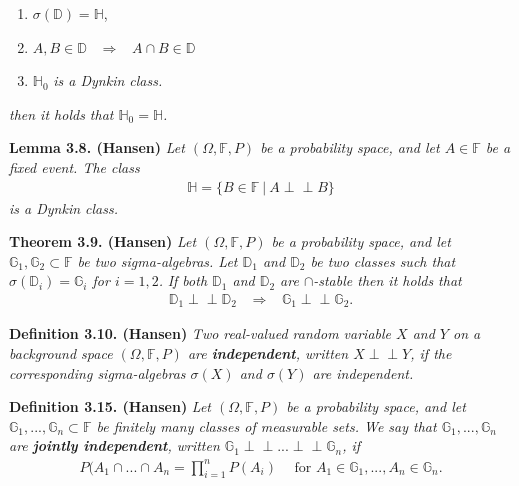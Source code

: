 \documentclass[a4paper,12pt,openany]{book}
\providecommand{\tightlist}{%
 \setlength{\itemsep}{0pt}\setlength{\parskip}{0pt}}
\begin{document}
\begin{enumerate}
\def\labelenumi{\arabic{enumi}.}
\tightlist
\item
  \(\sigma(\mathbb{D})=\mathbb{H}\),
\item
  \(A,B\in\mathbb{D}\hspace{10pt}\Rightarrow\hspace{10pt}A\cap B\in\mathbb{D}\)
\item
  \(\mathbb{H}_0\) \emph{is a Dynkin class.}
\end{enumerate}

\emph{then it holds that \(\mathbb{H}_0=\mathbb{H}\).}

\textbf{Lemma 3.8. (Hansen)} \emph{Let \((\Omega,\mathbb{F},P)\) be a probability space, and let \(A\in\mathbb{F}\) be a fixed event. The class}
\begin{align*}
    \mathbb{H}=\{B\in \mathbb{F}\ \vert\ A\perp \!\!\! \perp B\}
\end{align*}
\emph{is a Dynkin class.}

\textbf{Theorem 3.9. (Hansen)} \emph{Let \((\Omega,\mathbb{F},P)\) be a probability space, and let \(\mathbb{G}_1,\mathbb{G}_2\subset \mathbb{F}\) be two sigma-algebras. Let \(\mathbb{D}_1\) and \(\mathbb{D}_2\) be two classes such that \(\sigma(\mathbb{D}_i)=\mathbb{G}_i\) for \(i=1,2\).}
\emph{If both \(\mathbb{D}_1\) and \(\mathbb{D}_2\) are \(\cap\)-stable then it holds that}
\begin{align*}
    \mathbb{D}_1\perp \!\!\! \perp\mathbb{D}_2\hspace{10pt}\Rightarrow \hspace{10pt} \mathbb{G}_1\perp \!\!\! \perp\mathbb{G}_2.
\end{align*}

\textbf{Definition 3.10. (Hansen)} \emph{Two real-valued random variable \(X\) and \(Y\) on a background space \((\Omega,\mathbb{F},P)\) are \textbf{independent}, written \(X\perp \!\!\! \perp Y\), if the corresponding sigma-algebras \(\sigma(X)\) and \(\sigma(Y)\) are independent.}

\textbf{Definition 3.15. (Hansen)} \emph{Let \((\Omega,\mathbb{F},P)\) be a probability space, and let \(\mathbb{G}_1,...,\mathbb{G}_n\subset \mathbb{F}\) be finitely many classes of measurable sets. We say that \(\mathbb{G}_1,...,\mathbb{G}_n\) are \textbf{jointly independent}, written \(\mathbb{G}_1\perp \!\!\! \perp...\perp \!\!\! \perp\mathbb{G}_n\), if}
\begin{align*}
    P(A_1\cap ...\cap A_n=\prod_{i=1}^nP(A_i)\hspace{15pt}\text{for }A_1\in\mathbb{G}_1,...,A_n\in\mathbb{G}_n.\tag{3.8}
\end{align*}
\end{document}
